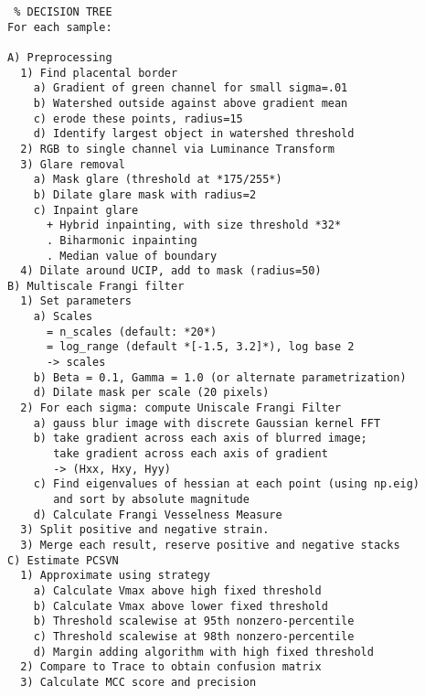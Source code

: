     \begin{spacing}{1}
    \begin{small}
    \begin{verbatim} % DECISION TREE
For each sample:

A) Preprocessing
  1) Find placental border
  	a) Gradient of green channel for small sigma=.01
  	b) Watershed outside against above gradient mean
  	c) erode these points, radius=15
  	d) Identify largest object in watershed threshold
  2) RGB to single channel via Luminance Transform
  3) Glare removal
    a) Mask glare (threshold at *175/255*)
    b) Dilate glare mask with radius=2
    c) Inpaint glare
      + Hybrid inpainting, with size threshold *32*
      . Biharmonic inpainting
      . Median value of boundary
  4) Dilate around UCIP, add to mask (radius=50)
B) Multiscale Frangi filter
  1) Set parameters
    a) Scales
      = n_scales (default: *20*)
      = log_range (default *[-1.5, 3.2]*), log base 2
      -> scales
    b) Beta = 0.1, Gamma = 1.0 (or alternate parametrization)
    d) Dilate mask per scale (20 pixels)
  2) For each sigma: compute Uniscale Frangi Filter
    a) gauss blur image with discrete Gaussian kernel FFT
    b) take gradient across each axis of blurred image;
       take gradient across each axis of gradient
       -> (Hxx, Hxy, Hyy)
    c) Find eigenvalues of hessian at each point (using np.eig)
       and sort by absolute magnitude 
    d) Calculate Frangi Vesselness Measure
  3) Split positive and negative strain.
  3) Merge each result, reserve positive and negative stacks
C) Estimate PCSVN
  1) Approximate using strategy
    a) Calculate Vmax above high fixed threshold
    b) Calculate Vmax above lower fixed threshold
    b) Threshold scalewise at 95th nonzero-percentile
    c) Threshold scalewise at 98th nonzero-percentile
    d) Margin adding algorithm with high fixed threshold
  2) Compare to Trace to obtain confusion matrix
  3) Calculate MCC score and precision
\end{verbatim}
    \end{small}
\end{spacing}
